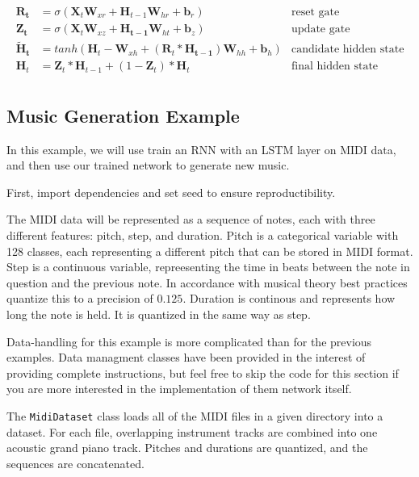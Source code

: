 \documentclass{article}
\begin{document}
\begin{align*}
    \bm{R_t} &= \sigma(\bm{X}_t\bm{W}_{xr} + \bm{H}_{t-1}\bm{W}_{hr} + \bm{b}_r) & \text{reset gate} \\
    \bm{Z_t} &= \sigma(\bm{X}_t\bm{W}_{xz} + \bm{H_{t-1}}\bm{W}_{ht} + \bm{b}_z) & \text{update gate} \\
    \bm{\tilde{H}_t} &= tanh(\bm{H}_t - \bm{W}_{xh} + (\bm{R}_t * \bm{H_{t-1}})\bm{W}_{hh} + \bm{b}_h) & \text{candidate hidden state} \\
    \bm{H}_t &= \bm{Z}_t * \bm{H}_{t-1} + (1 - \bm{Z}_t)*\bm{H}_t & \text{final hidden state} \\
\end{align*}

\subsection{Music Generation Example}

In this example, we will use train an RNN with an LSTM layer on MIDI data, and then use our trained network to generate new music.

First, import dependencies and set seed to ensure reproductibility.



The MIDI data will be represented as a sequence of notes, each with three different features: pitch, step, and duration. Pitch is a categorical variable with 128 classes, each representing a different pitch that can be stored in MIDI format. Step is a continuous variable, repreesenting the time in beats between the note in question and the previous note. In accordance with musical theory best practices quantize this to a precision of \(0.125\). Duration is continous and represents how long the note is held. It is quantized in the same way as step.

Data-handling for this example is more complicated than for the previous examples. Data managment classes have been provided in the interest of providing complete instructions, but feel free to skip the code for this section if you are more interested in the implementation of them network itself. 

The \lstinline{MidiDataset} class loads all of the MIDI files in a given directory into a dataset. For each file, overlapping instrument tracks are combined into one acoustic grand piano track. Pitches and durations are quantized, and the sequences are concatenated. 
\end{document}
